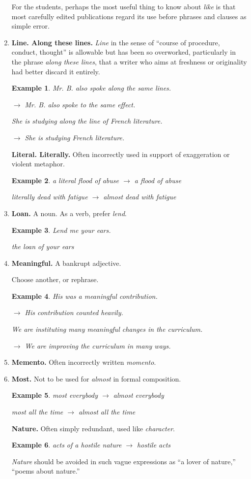 \documentclass{article}
\newtheorem{example}{Example}
\begin{document}
\begin{enumerate}
	For the students, perhaps the most useful thing to know about {\it like} is that most carefully edited publications regard its use before phrases and clauses as simple error.
	\item {\bf Line. Along these lines.} {\it Line} in the sense of ``course of procedure, conduct, thought'' is allowable but has been so overworked, particularly in the phrase {\it along these lines}, that a writer who aims at freshness or originality had better discard it entirely.
	\begin{example}
		Mr. B. also spoke along the same lines.
		
		$\to$ Mr. B. also spoke to the same effect.
		
		She is studying along the line of French literature.
		
		$\to$ She is studying French literature.
	\end{example}
	{\bf Literal. Literally.} Often incorrectly used in support of exaggeration or violent metaphor.
	\begin{example}
		a literal flood of abuse $\to$ a flood of abuse
		
		literally dead with fatigue $\to$ almost dead with fatigue
	\end{example}
	\item {\bf Loan.} A noun. As a verb, prefer {\it lend}.
	\begin{example}
		Lend me your ears.
		
		the loan of your ears
	\end{example}
	\item {\bf Meaningful.} A bankrupt adjective.
	
	Choose another, or rephrase.
	\begin{example}
		His was a meaningful contribution.
		
		$\to$ His contribution counted heavily.
		
		We are instituting many meaningful changes in the curriculum.
		
		$\to$ We are improving the curriculum in many ways.
	\end{example}
	\item {\bf Memento.} Often incorrectly written {\it momento}.
	\item {\bf Most.} Not to be used for {\it almost} in formal composition.
	\begin{example}
		most everybody $\to$ almost everybody
		
		most all the time $\to$ almost all the time
	\end{example}
	{\bf Nature.} Often simply redundant, used like {\it character}.
	\begin{example}
		acts of a hostile nature $\to$ hostile acts
	\end{example}
	{\it Nature} should be avoided in such vague expressions as ``a lover of nature,'' ``poems about nature.''
	

\end{enumerate}
\end{document}
